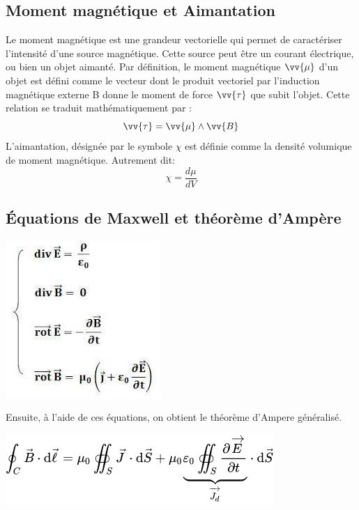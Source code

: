 \documentclass[10pt,a4paper]{article}
\begin{document}
\subsection{Moment magnétique et Aimantation}
Le moment magnétique est une grandeur vectorielle qui permet de caractériser l'intensité d'une source magnétique. Cette source peut être un courant électrique, ou bien un objet aimanté. Par définition, le moment magnétique $\vv{\mu}$ d'un objet est défini comme le vecteur dont le produit vectoriel par l'induction magnétique externe B donne le moment de force $\vv{\tau}$ que subit l'objet. Cette relation se traduit mathématiquement par : 
\begin{equation}
\vv{\tau}=\vv{\mu} \wedge \vv{B}
\end{equation}
L'aimantation,  désignée par le symbole $\chi$ est définie comme la densité volumique de moment magnétique. Autrement dit:
\begin{equation}
\chi=\frac{d\mu}{dV}
\end{equation}
\subsection{Équations de Maxwell et théorème d'Ampère}
\begin{center}
\includegraphics[scale=0.7]{images/equ_maxwell.jpg} 
\end{center}
Ensuite, à l'aide de ces équations, on obtient le théorème d'Ampere généralisé.
\begin{center}
\includegraphics[scale=0.7]{images/theoreme_ampere.png} 
\end{center}
\end{document}
